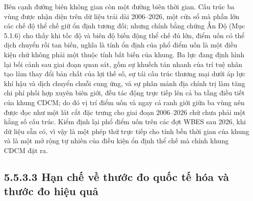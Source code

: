 \documentclass[
  a4paper,
  13pt]{extreport}
\begin{document}
Bên cạnh đường biên không gian còn một đường biên thời gian. Cấu trúc ba
vùng được nhận diện trên dữ liệu trải dài 2006--2026, một cửa sổ mà phần
lớn các chế độ thể chế giữ ổn định tương đối; nhưng chính bằng chứng Ấn
Độ (Mục 5.1.6) cho thấy khi tốc độ và biên độ biến động thể chế đủ lớn,
điểm uốn có thể dịch chuyển rồi tan biến, nghĩa là tính ổn định của phổ
điểm uốn là một điều kiện chứ không phải một thuộc tính bất biến của
khung. Ba lực đang định hình lại bối cảnh sau giai đoạn quan sát, gồm sự
khuếch tán nhanh của trí tuệ nhân tạo làm thay đổi bản chất của lợi thế
số, sự tái cấu trúc thương mại dưới áp lực khí hậu và dịch chuyển chuỗi
cung ứng, và sự phân mảnh địa chính trị làm tăng chi phí phối hợp xuyên
biên giới, đều tác động trực tiếp lên cả ba tầng điều tiết của khung
CDCM; do đó vị trí điểm uốn và ngay cả ranh giới giữa ba vùng nên được
đọc như một lát cắt đặc trưng cho giai đoạn 2006--2026 chứ chưa phải một
hằng số cấu trúc. Kiểm định lại phổ điểm uốn trên các đợt WBES sau 2026,
khi dữ liệu sẵn có, vì vậy là một phép thử trực tiếp cho tính bền thời
gian của khung và là một mở rộng tự nhiên của điều kiện ổn định thể chế
mà chính khung CDCM đặt ra.

\hypertarget{hux1ea1n-chux1ebf-vux1ec1-thux1b0ux1edbc-ux111o-quux1ed1c-tux1ebf-huxf3a-vuxe0-thux1b0ux1edbc-ux111o-hiux1ec7u-quux1ea3}{%
\subsection{5.5.3.3 Hạn chế về thước đo quốc tế hóa và thước đo hiệu
quả}\label{hux1ea1n-chux1ebf-vux1ec1-thux1b0ux1edbc-ux111o-quux1ed1c-tux1ebf-huxf3a-vuxe0-thux1b0ux1edbc-ux111o-hiux1ec7u-quux1ea3}}
\end{document}
